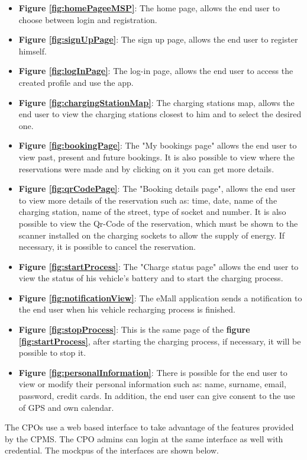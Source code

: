 \begin{itemize}
    \item \textbf{Figure \ref{fig:homePageeMSP}}: The home page, allows the end user to choose between login and registration.
    \item \textbf{Figure \ref{fig:signUpPage}}: The sign up page, allows the end user to register himself.
    \item \textbf{Figure \ref{fig:logInPage}}: The log-in page, allows the end user to access the created profile and use the app.
    \item \textbf{Figure \ref{fig:chargingStationMap}}: The charging stations map, allows the end user to view the charging stations closest to him and to select the desired one.
    \item \textbf{Figure \ref{fig:bookingPage}}: The "My bookings page" allows the end user to view past, present and future bookings. It is also possible to view where the reservations were made and by clicking on it you can get more details.
    \item \textbf{Figure \ref{fig:qrCodePage}}: The "Booking details page", allows the end user to view more details of the reservation such as: time, date, name of the charging station, name of the street, type of socket and number. It is also possible to view the Qr-Code of the reservation, which must be shown to the scanner installed on the charging sockets to allow the supply of energy. If necessary, it is possible to cancel the reservation.
    \item \textbf{Figure \ref{fig:startProcess}}: The "Charge status page" allows the end user to view the status of his vehicle's battery and to start the charging process.
    \item \textbf{Figure \ref{fig:notificationView}}: The eMall application sends a notification to the end user when his vehicle recharging process is finished.
    \item \textbf{Figure \ref{fig:stopProcess}}: This is the same page of the \textbf{figure \ref{fig:startProcess}}, after starting the charging process, if necessary, it will be possible to stop it.
    \item \textbf{Figure \ref{fig:personalInformation}}: There is possible for the end user to view or modify their personal information such as: name, surname, email, password, credit cards. In addition, the end user can give consent to the use of GPS and own calendar.
\end{itemize}  
\newpage
The CPOs use a web based interface to take advantage of the features provided by the CPMS. The CPO admins can login at the same interface as well with credential. The mockpus of the interfaces are shown below.\\
